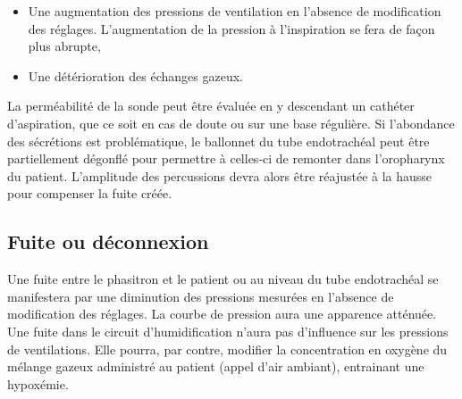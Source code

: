 \begin{itemize}
	\item Une augmentation des pressions de ventilation en l'absence de
	modification des réglages. L'augmentation de la pression à l'inspiration se
	fera de façon plus abrupte, 
	\item Une détérioration des échanges gazeux.
\end{itemize}

La perméabilité de la sonde peut être évaluée en y descendant un cathéter
d'aspiration, que ce soit en cas de doute ou sur une base régulière.  Si
l'abondance des sécrétions est problématique, le ballonnet du tube endotrachéal
peut être partiellement dégonflé pour permettre à celles-ci de remonter dans
l'oropharynx du patient. L'amplitude des percussions devra alors être réajustée
à la hausse pour compenser la fuite créée.

\subsection{Fuite ou déconnexion}

Une fuite entre le phasitron et le patient ou au niveau du tube endotrachéal se
manifestera par une diminution des pressions mesurées en l'absence de
modification des réglages. La courbe de pression aura une apparence atténuée.
Une fuite dans le circuit d'humidification n’aura pas d'influence sur les
pressions de ventilations. Elle pourra, par contre, modifier la concentration
en oxygène du mélange gazeux administré au patient (appel d’air ambiant),
entrainant une hypoxémie.
\clearpage
\begin{wide}

\end{wide}
